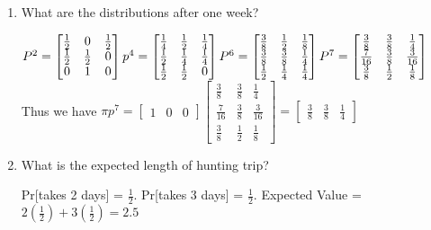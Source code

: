 \begin{enumerate}
\item
What are the distributions after one week?
\begin{solution}[6cm]
$ 
P^2 = 
\begin{bmatrix}
\frac{1}{2} & 0 & \frac{1}{2} \\
\frac{1}{2} & \frac{1}{2} & 0 \\
0 & 1 & 0
\end{bmatrix}
p^4 = 
\begin{bmatrix}
\frac{1}{4} & \frac{1}{2} & \frac{1}{4} \\
\frac{1}{2} & \frac{1}{4} & \frac{1}{4} \\
\frac{1}{2} & \frac{1}{2} & 0\end{bmatrix} 
P^6 = 
\begin{bmatrix}
\frac{3}{8} & \frac{1}{2} & \frac{1}{8} \\
\frac{3}{8} & \frac{3}{8} & \frac{1}{4} \\
\frac{1}{2} & \frac{1}{4} & \frac{1}{4}
\end{bmatrix} 
P^7 = 
\begin{bmatrix}
\frac{3}{8} & \frac{3}{8} & \frac{1}{4} \\
\frac{7}{16} & \frac{3}{8} & \frac{3}{16} \\
\frac{3}{8} & \frac{1}{2} & \frac{1}{8}
\end{bmatrix} \\ $
Thus we have $\pi p^7 = \begin{bmatrix} 1 & 0 & 0 \end{bmatrix} 
\begin{bmatrix} 
\frac{3}{8} & \frac{3}{8} & \frac{1}{4} \\
\frac{7}{16} & \frac{3}{8} & \frac{3}{16} \\
\frac{3}{8} & \frac{1}{2} & \frac{1}{8}
\end{bmatrix} = 
\begin{bmatrix} \frac{3}{8} & \frac{3}{8} & \frac{1}{4} \end{bmatrix}$
\end{solution}

\item
What is the expected length of hunting trip?
\begin{solution}[2cm]
Pr[takes 2 days] = $\frac{1}{2}$. Pr[takes 3 days] = $\frac{1}{2}$.
Expected Value = $2(\frac{1}{2}) + 3(\frac{1}{2}) = 2.5$
\end{solution}
\end{enumerate}